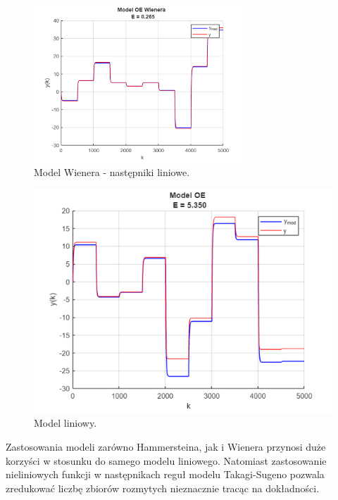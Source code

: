 \begin{figure}[h!]
\centering
\includegraphics[width=0.7\textwidth]{pictures/model_wienera_lin}
\caption{Model Wienera - następniki liniowe.}
\end{figure}

\newpage

\begin{figure}[h!]
\centering
\includegraphics[width=\textwidth]{pictures/model_OE}
\caption{Model liniowy.}
\end{figure}

Zastosowania modeli zarówno Hammersteina, jak i Wienera przynosi duże korzyści w stosunku do samego modelu liniowego. Natomiast zastosowanie nieliniowych funkcji w następnikach reguł modelu Takagi-Sugeno pozwala zredukować liczbę zbiorów rozmytych nieznacznie tracąc na dokładności.